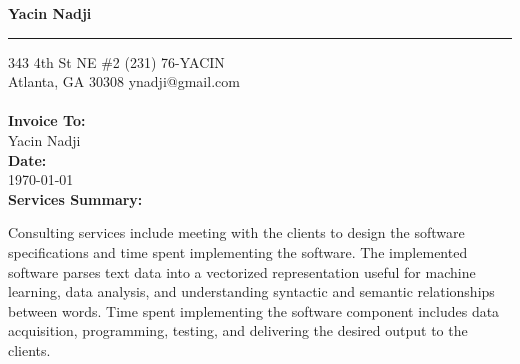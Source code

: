 \documentclass{invoice} %
\def \tab {\hspace*{3ex}} %
\begin{document}

\hfil{\Huge\bf Yacin Nadji}\hfil %
\bigskip\break %
\hrule %

343 4th St NE \#2 \hfill (231) 76-YACIN \\ %
Atlanta, GA 30308 \hfill ynadji@gmail.com
\\ \\
{\bf Invoice To:} \\
\tab Yacin Nadji \\ %

{\bf Date:} \\
\tab \today \\ %

\textbf{Services Summary:}

\tab Consulting services include meeting with the clients to design the
software specifications and time spent implementing the software. The
implemented software parses text data into a vectorized representation useful
for machine learning, data analysis, and understanding syntactic and semantic
relationships between words. Time spent implementing the software component
includes data acquisition, programming, testing, and delivering the desired
output to the clients.


\begin{invoiceTable}



%
%
%

\subtotal %


%

\end{invoiceTable}

\end{document}

